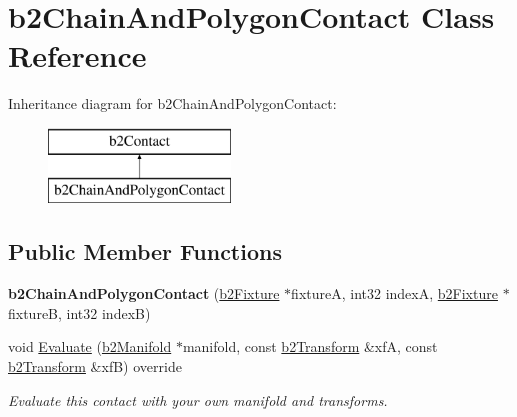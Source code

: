 \hypertarget{classb2_chain_and_polygon_contact}{}\section{b2\+Chain\+And\+Polygon\+Contact Class Reference}
\label{classb2_chain_and_polygon_contact}
Inheritance diagram for b2\+Chain\+And\+Polygon\+Contact\+:\begin{figure}[H]
\begin{center}
\leavevmode
\includegraphics[height=2.000000cm]{classb2_chain_and_polygon_contact}
\end{center}
\end{figure}
\subsection*{Public Member Functions}
\begin{DoxyCompactItemize}
\item 
\mbox{\label{classb2_chain_and_polygon_contact_ae43cd05c72ccaeb5f03efc5df944648b}} 
{\bfseries b2\+Chain\+And\+Polygon\+Contact} (\hyperlink{classb2_fixture}{b2\+Fixture} $\ast$fixtureA, int32 indexA, \hyperlink{classb2_fixture}{b2\+Fixture} $\ast$fixtureB, int32 indexB)
\item 
\mbox{\label{classb2_chain_and_polygon_contact_a607e7a8b4b0a5ee9bfd100a365fb6f3b}} 
void \hyperlink{classb2_chain_and_polygon_contact_a607e7a8b4b0a5ee9bfd100a365fb6f3b}{Evaluate} (\hyperlink{structb2_manifold}{b2\+Manifold} $\ast$manifold, const \hyperlink{structb2_transform}{b2\+Transform} \&xfA, const \hyperlink{structb2_transform}{b2\+Transform} \&xfB) override
\begin{DoxyCompactList}\small\item\em Evaluate this contact with your own manifold and transforms. \end{DoxyCompactList}\end{DoxyCompactItemize}
